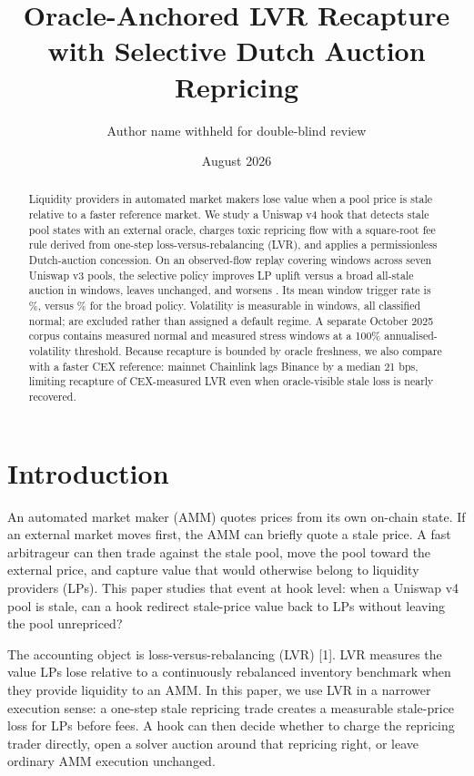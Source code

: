 \documentclass[11pt]{article}
\title{Oracle-Anchored LVR Recapture with Selective Dutch Auction Repricing}
\author{Author name withheld for double-blind review}
\date{August 2026}
\begin{document}
\maketitle

\begin{abstract}
Liquidity providers in automated market makers lose value when a pool price is stale relative to a faster reference market. We study a Uniswap v4 hook that detects stale pool states with an external oracle, charges toxic repricing flow with a square-root fee rule derived from one-step loss-versus-rebalancing (LVR), and applies a permissionless Dutch-auction concession. On an observed-flow replay covering \EvidenceAblationWindows{} windows across seven Uniswap v3 pools, the selective policy improves LP uplift versus a broad all-stale auction in \EvidenceAblationImproved{} windows, leaves \EvidenceAblationUnchanged{} unchanged, and worsens \EvidenceAblationWorsened{}. Its mean window trigger rate is \EvidenceSelectiveTriggerPct\%, versus \EvidenceBroadTriggerPct\% for the broad policy. Volatility is measurable in \EvidenceMeasuredAblationWindows{} windows, all classified normal; \EvidenceUnmeasurableAblationWindows{} are excluded rather than assigned a default regime. A separate October 2025 corpus contains \EvidenceOctoberNormal{} measured normal and \EvidenceOctoberStress{} measured stress windows at a 100\% annualised-volatility threshold. Because recapture is bounded by oracle freshness, we also compare with a faster CEX reference: mainnet Chainlink lags Binance by a median 21 bps, limiting recapture of CEX-measured LVR even when oracle-visible stale loss is nearly recovered.
\end{abstract}

\section{Introduction}
An automated market maker (AMM) quotes prices from its own on-chain state. If an external market moves first, the AMM can briefly quote a stale price. A fast arbitrageur can then trade against the stale pool, move the pool toward the external price, and capture value that would otherwise belong to liquidity providers (LPs). This paper studies that event at hook level: when a Uniswap v4 pool is stale, can a hook redirect stale-price value back to LPs without leaving the pool unrepriced?

The accounting object is loss-versus-rebalancing (LVR) [1]. LVR measures the value LPs lose relative to a continuously rebalanced inventory benchmark when they provide liquidity to an AMM. In this paper, we use LVR in a narrower execution sense: a one-step stale repricing trade creates a measurable stale-price loss for LPs before fees. A hook can then decide whether to charge the repricing trader directly, open a solver auction around that repricing right, or leave ordinary AMM execution unchanged.
\end{document}
